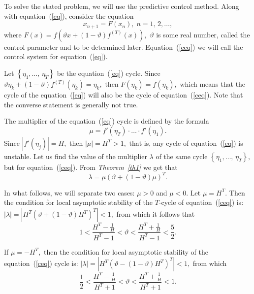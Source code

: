 \documentclass[12pt,a4paper]{amsart}
\begin{document}
\section{}

To solve the stated problem, we will use the predictive control method. Along with equation~(\ref{eq}), consider the equation
\begin{equation}\label{ceq}
x_{n+1}=F(x_n),\;n=1,\,2,\ldots,
\end{equation}
where $F(x)=f\left(\vartheta x + (1-\vartheta)f^{(T)}(x)\right),$ $\vartheta$ is some real number, called the control parameter and to be determined later.
Equation~(\ref{ceq}) we will call the control system for equation~(\ref{eq}). 

Let $\left\{\eta_1,\ldots,\,\eta_T\right\}$ be the equation~(\ref{eq}) cycle. Since $\vartheta \eta_k + (1-\vartheta)f^{(T)}(\eta_k)=\eta_k,$ then 
$F(\eta_k)=f(\eta_k),$ which means that the cycle of the equation~(\ref{eq}) will also be the cycle of equation~(\ref{ceq}). Note that the converse statement 
is generally not true. 

The multiplier of the equation~(\ref{eq}) cycle is defined by the formula
$$
\mu = f'(\eta_T)\cdot\ldots\cdot f'(\eta_1). 
$$
Since $\left|f'(\eta_j)\right|=H,$ then $|\mu|=H^T>1,$ that is, any cycle of equation~(\ref{eq}) is unstable. Let us find the value of the multiplier 
$\lambda$ of the same cycle $\left\{\eta_1,\ldots,\,\eta_T\right\},$ but for equation~(\ref{ceq}). From \textit{Theorem~\ref{th1}} we get that 
$$
\lambda=\mu \left(\vartheta+(1-\vartheta)\mu\right)^T. 
$$

In what follows, we will separate two cases: $\mu>0$ and $\mu<0.$ Let $\mu=H^T.$ Then the condition for local asymptotic stability 
of the $T$-cycle of equation~(\ref{ceq}) is: $|\lambda|=\left|H^T \left(\vartheta + (1-\vartheta)H^T\right)^T\right|<1,$ 
from which it follows that 
\begin{equation}\label{inp}
1<
\frac{H^T-\frac{1}{H}}{H^T-1}<
\vartheta<
\frac{H^T+\frac{1}{H}}{H^T-1}<
\frac52.
\end{equation}

If $\mu=-H^T,$ then the condition for local asymptotic stability of the equation~(\ref{ceq}) cycle is: 
$|\lambda|=\left|H^T \left(\vartheta - (1-\vartheta)H^T\right)^T\right|<1,$
from which 
\begin{equation}\label{inn}
\frac12<
\frac{H^T-\frac{1}{H}}{H^T+1}<
\vartheta<
\frac{H^T+\frac{1}{H}}{H^T+1}<
1.
\end{equation}
\end{document}
